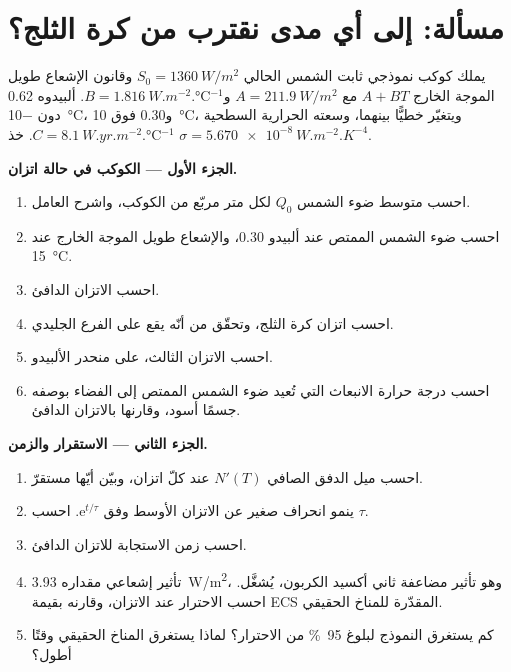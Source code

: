 \section{مسألة: إلى أي مدى نقترب من كرة الثلج؟}

\begin{problem}
\label{pb:b3:climate-models:1}
يملك كوكب نموذجي ثابت الشمس الحالي $S_0 = \qty{1360}{W/m^2}$
وقانون الإشعاع طويل الموجة الخارج $A + BT$ مع $A = \qty{211.9}{W/m^2}$ و$B =
\qty{1.816}{W.m^{-2}.\celsius^{-1}}$. ألبيدوه 0.62 دون \qty{-10}{\celsius}،
و0.30 فوق \qty{+10}{\celsius}، ويتغيّر خطيًّا بينهما،
وسعته الحرارية السطحية $C = \qty{8.1}{W.yr.m^{-2}.\celsius^{-1}}$. خذ
$\sigma = \qty{5.670e-8}{W.m^{-2}.K^{-4}}$.

\medskip\noindent\textbf{الجزء الأول --- الكوكب في حالة اتزان.}
\begin{enumerate}
\item احسب متوسط ضوء الشمس $Q_0$ لكل متر مربّع من الكوكب،
  واشرح العامل.
\item احسب ضوء الشمس الممتص عند ألبيدو 0.30، والإشعاع طويل الموجة الخارج عند
  \qty{15}{\celsius}.
\item احسب الاتزان الدافئ.
\item احسب اتزان كرة الثلج، وتحقّق من أنّه يقع على الفرع
  الجليدي.
\item احسب الاتزان الثالث، على منحدر الألبيدو.
\item احسب درجة حرارة الانبعاث التي تُعيد ضوء الشمس الممتص إلى الفضاء
  بوصفه جسمًا أسود، وقارنها بالاتزان الدافئ.
\end{enumerate}

\medskip\noindent\textbf{الجزء الثاني --- الاستقرار والزمن.}
\begin{enumerate}[resume]
\item احسب ميل الدفق الصافي $N'(T)$ عند كلّ اتزان، وبيّن
  أيّها مستقرّ.
\item ينمو انحراف صغير عن الاتزان الأوسط وفق $\mathrm
  e^{t/\tau}$. احسب $\tau$.
\item احسب زمن الاستجابة للاتزان الدافئ.
\item تأثير إشعاعي مقداره \qty{3.93}{W/m^2}، وهو تأثير مضاعفة ثاني أكسيد الكربون،
  يُشغَّل. احسب الاحترار عند الاتزان، وقارنه بقيمة
  ECS المقدّرة للمناخ الحقيقي.
\item كم يستغرق النموذج لبلوغ \qty{95}{\percent} من
  الاحترار؟ لماذا يستغرق المناخ الحقيقي وقتًا أطول؟
\end{enumerate}


\end{problem}

